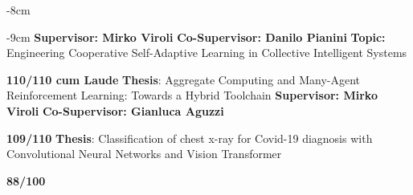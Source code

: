 \documentclass[10pt,a4paper]{altacv}
\begin{document}

    \begin{adjustwidth}{}{-8cm}
        \makecvheader
    \end{adjustwidth}

\begin{adjustwidth}{}{-9cm}
    \textbf{Supervisor: Mirko Viroli} \newline \textbf{Co-Supervisor: Danilo Pianini} \newline
    \textbf{Topic:} Engineering Cooperative Self-Adaptive Learning in Collective Intelligent Systems

    \divider

    \textbf{110/110 cum Laude} \newline
    \textbf{Thesis}: Aggregate Computing and Many-Agent Reinforcement Learning: Towards a Hybrid Toolchain \newline
    \textbf{Supervisor: Mirko Viroli} \newline \textbf{Co-Supervisor: Gianluca Aguzzi}

    \divider

    \textbf{109/110} \newline
    \textbf{Thesis}: Classification of chest x-ray for Covid-19 diagnosis with Convolutional Neural Networks and Vision Transformer


    \divider

    \textbf{88/100}
    \divider

\end{adjustwidth}
\end{document}
